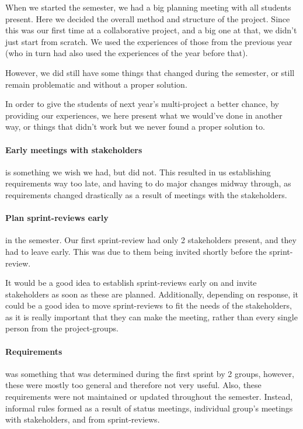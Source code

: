 When we started the semester, we had a big planning meeting with all students present.
Here we decided the overall method and structure of the project.
Since this was our first time at a collaborative project, and a big one at that, we didn't just start from scratch.
We used the experiences of those from the previous year (who in turn had also used the experiences of the year before that).

However, we did still have some things that changed during the semester, or still remain problematic and without a proper solution.

In order to give the students of next year's multi-project a better chance, by providing our experiences, we here present what we would've done in another way, or things that didn't work but we never found a proper solution to.

\paragraph{Early meetings with stakeholders} is something we wish we had, but did not.
This resulted in us establishing requirements way too late, and having to do major changes midway through, as requirements changed drastically as a result of meetings with the stakeholders.

\paragraph{Plan sprint-reviews early} in the semester.
Our first sprint-review had only 2 stakeholders present, and they had to leave early.
This was due to them being invited shortly before the sprint-review.

It would be a good idea to establish sprint-reviews early on and invite stakeholders as soon as these are planned.
Additionally, depending on response, it could be a good idea to move sprint-reviews to fit the needs of the stakeholders, as it is really important that they can make the meeting, rather than every single person from the project-groups.

\paragraph{Requirements} was something that was determined during the first sprint by 2 groups, however, these were mostly too general and therefore not very useful.
Also, these requirements were not maintained or updated throughout the semester.
Instead, informal rules formed as a result of status meetings, individual group's meetings with stakeholders, and from sprint-reviews.

